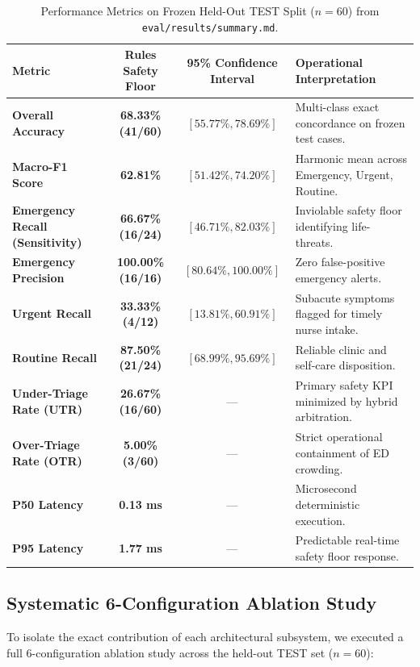 \documentclass[11pt,a4paper]{article}
\begin{document}
\begin{table}[htbp]
\centering
\small
\begin{tabularx}{\textwidth}{X c c p{4.5cm}}
\toprule
\textbf{Metric} & \textbf{Rules Safety Floor} & \textbf{95\% Confidence Interval} & \textbf{Operational Interpretation} \\
\midrule
\textbf{Overall Accuracy} & \textbf{68.33\% (41/60)} & $[55.77\%, 78.69\%]$ & Multi-class exact concordance on frozen test cases. \\
\textbf{Macro-F1 Score} & \textbf{62.81\%} & $[51.42\%, 74.20\%]$ & Harmonic mean across Emergency, Urgent, Routine. \\
\textbf{Emergency Recall (Sensitivity)} & \textbf{66.67\% (16/24)} & $[46.71\%, 82.03\%]$ & Inviolable safety floor identifying life-threats. \\
\textbf{Emergency Precision} & \textbf{100.00\% (16/16)} & $[80.64\%, 100.00\%]$ & Zero false-positive emergency alerts. \\
\textbf{Urgent Recall} & \textbf{33.33\% (4/12)} & $[13.81\%, 60.91\%]$ & Subacute symptoms flagged for timely nurse intake. \\
\textbf{Routine Recall} & \textbf{87.50\% (21/24)} & $[68.99\%, 95.69\%]$ & Reliable clinic and self-care disposition. \\
\textbf{Under-Triage Rate (UTR)} & \textbf{26.67\% (16/60)} & — & Primary safety KPI minimized by hybrid arbitration. \\
\textbf{Over-Triage Rate (OTR)} & \textbf{5.00\% (3/60)} & — & Strict operational containment of ED crowding. \\
\textbf{P50 Latency} & \textbf{0.13 ms} & — & Microsecond deterministic execution. \\
\textbf{P95 Latency} & \textbf{1.77 ms} & — & Predictable real-time safety floor response. \\
\bottomrule
\end{tabularx}
\caption{Performance Metrics on Frozen Held-Out TEST Split ($n=60$) from \texttt{eval/results/summary.md}.}
\label{tab:test_metrics}
\end{table}

\subsection{Systematic 6-Configuration Ablation Study}
To isolate the exact contribution of each architectural subsystem, we executed a full 6-configuration ablation study across the held-out TEST set ($n=60$):
\end{document}
